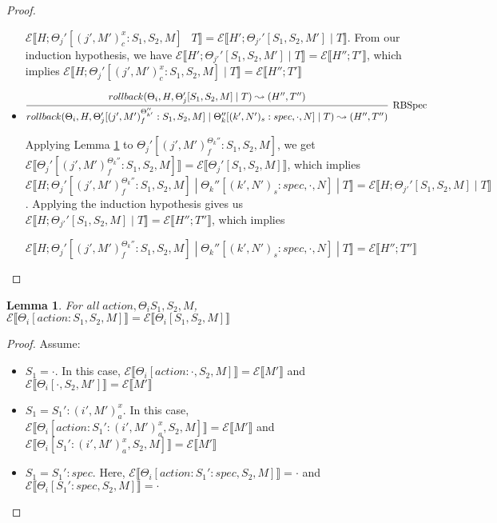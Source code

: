 \documentclass[9pt]{article}
\newtheorem{lemma}{Lemma}
\newcommand{\erase}[1]{\mathcal{E}\llbracket #1 \rrbracket}
\begin{document}
\begin{proof}
\begin{itemize}
$\erase{H; \Theta_j'[(j', M')_c^x : S_1, S_2, M] \; \ \; T} = \erase{H'; \Theta_{j'}'[S_1, S_2, M'] \; | \; T}$.  From our induction hypothesis, we have $\erase{H'; \Theta_{j'}'[S_1, S_2, M'] \; | \; T} = \erase{H''; T'}$, which implies $\erase{H; \Theta_j'[(j', M')_c^x : S_1, S_2, M] \; | \; T} = \erase{H''; T'}$

\item $\infer[\text{RBSpec}]{rollback(\Theta_i, H, \Theta_j'[(j', M')_f^{\Theta_{k'}''} : S_1, S_2, M] \; | \; \Theta_k''[(k', N')_s : spec, \cdot, N] \; | \; T) \leadsto (H'', T'')}{rollback(\Theta_i, H, \Theta_j'[S_1, S_2, M] \; | \; T) \leadsto (H'', T'')}$

Applying Lemma \ref{eraseAction} to $\Theta_j'[(j', M')_f^{\Theta_k''} : S_1, S_2, M]$, we get $\erase{\Theta_j'[(j', M')_f^{\Theta_k''} : S_1, S_2, M]} = \erase{\Theta_j'[S_1, S_2, M]}$, which implies $\erase{H; \Theta_j'[(j', M')_f^{\Theta_k''} : S_1, S_2, M] \; | \; \Theta_k''[(k', N')_s : spec, \cdot, N] \; | \; T} = \erase{H; \Theta_{j'}'[S_1, S_2, M] \; | \; T}$.  Applying the induction hypothesis gives us $\erase{H; \Theta_{j'}'[S_1, S_2, M] \; | \; T} = \erase{H''; T''}$, which implies

$\erase{H; \Theta_j'[(j', M')_f^{\Theta_k''} : S_1, S_2, M] \; | \; \Theta_k''[(k', N')_s : spec, \cdot, N] \; | \; T} = \erase{H''; T''}$

\end{itemize}
\end{proof}

\begin{lemma}
\label{eraseAction}
For all $action, \Theta_i S_1, S_2, M$, $\erase{\Theta_i[action :  S_1, S_2, M]} = \erase{\Theta_i[S_1, S_2, M]}$
\end{lemma}

\begin{proof}

Assume:

\begin{itemize}
\item $S_1 = \cdot$.  In this case, $\erase{\Theta_i[action : \cdot, S_2, M]} = \erase{M'}$ and $\erase{\Theta_i[\cdot, S_2, M']} = \erase{M'}$
\item $S_1 = S_1' : (i', M')_{a}^x$.  In this case, $\erase{\Theta_i[action : S_1' : (i', M')_{a}^x, S_2, M]} = \erase{M'}$ and $\erase{\Theta_i[S_1' : (i', M')_{a}^x, S_2, M]} = \erase{M'}$
\item $S_1 = S_1' : spec$. Here, $\erase{\Theta_i[action : S_1' : spec, S_2, M]} = \cdot$ and $\erase{\Theta_i[S_1' : spec, S_2, M]} = \cdot$
\end{itemize}


\end{proof}
\end{document}
